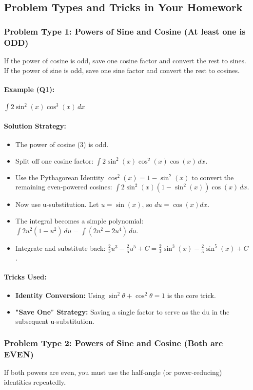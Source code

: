 \documentclass{article}
\begin{document}
\subsection{Problem Types and Tricks in Your Homework}
\subsubsection{Problem Type 1: Powers of Sine and Cosine (At least one is ODD)}
If the power of cosine is odd, save one cosine factor and convert the rest to sines. If the power of sine is odd, save one sine factor and convert the rest to cosines.
\paragraph{Example (Q1):} $ \int 2\sin^2(x)\cos^3(x) \,dx $
\paragraph{Solution Strategy:}
\begin{itemize}
    \item The power of cosine (3) is odd.
    \item Split off one cosine factor: $\int 2\sin^2(x)\cos^2(x)\cos(x) \,dx$.
    \item Use the Pythagorean Identity $\cos^2(x) = 1-\sin^2(x)$ to convert the remaining even-powered cosines: $\int 2\sin^2(x)(1-\sin^2(x))\cos(x) \,dx$.
    \item Now use u-substitution. Let $u=\sin(x)$, so $du=\cos(x)dx$.
    \item The integral becomes a simple polynomial: $\int 2u^2(1-u^2) \,du = \int (2u^2-2u^4) \,du$.
    \item Integrate and substitute back: $\frac{2}{3}u^3 - \frac{2}{5}u^5 + C = \frac{2}{3}\sin^3(x) - \frac{2}{5}\sin^5(x) + C$.
\end{itemize}
\paragraph{Tricks Used:}
\begin{itemize}
    \item \textbf{Identity Conversion:} Using $\sin^2\theta + \cos^2\theta = 1$ is the core trick.
    \item \textbf{"Save One" Strategy:} Saving a single factor to serve as the du in the subsequent u-substitution.
\end{itemize}

\subsubsection{Problem Type 2: Powers of Sine and Cosine (Both are EVEN)}
If both powers are even, you must use the half-angle (or power-reducing) identities repeatedly.
\end{document}
